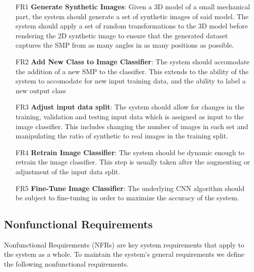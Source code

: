 \documentclass[a4paper,12pt,twoside]{report}
\begin{document}
\begin{itemize}
\item [FR1] \textbf{Generate Synthetic Images}: Given a 3D model of a small mechanical part, the system should generate a set of synthetic images of said model. The system should apply a set of random transformations to the 3D model before rendering the 2D synthetic image to ensure that the generated dataset captures the SMP from as many angles in as many positions as possible.

\item [FR2] \textbf{Add New Class to Image Classifier}: The system should accomodate the addition of a new SMP to the classifier. This extends to the ability of the system to accomodate for new input training data, and the ability to label a new output class

\item [FR3] \textbf{Adjust input data split}: The system should allow for changes in the training, validation and testing input data which is assigned as input to the image classifier. This includes changing the number of images in each set and manipulating the ratio of synthetic to real images in the training split.

\item [FR4] \textbf{Retrain Image Classifier}: The system should be dynamic enough to retrain the image classifier. This step is usually taken after the augmenting or adjustment of the input data split.

\item [FR5] \textbf{Fine-Tune Image Classifier}: The underlying CNN algorithm should be subject to fine-tuning in order to maximize the accuracy of the system.
\end{itemize}

\subsection{Nonfunctional Requirements}

Nonfunctional Requirements (NFRs) are key system requirements that apply to the system as a whole. To maintain the system's general requirements we define the following nonfunctional requirements.
\end{document}
